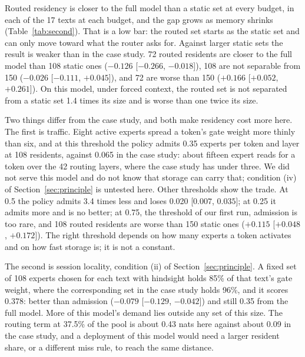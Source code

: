 \documentclass[11pt]{article}
\newcommand{\ci}[2]{[$#1$, $#2$]}
\begin{document}
Routed residency is closer to the full model than a static set at every budget, in each of the
17 texts at each budget, and the gap grows as memory shrinks (Table~\ref{tab:second}). That is
a low bar: the routed set starts as the static set and can only move toward what the router
asks for. Against larger static sets the result is weaker than in the case study. 72 routed
residents are closer to the full model than 108 static ones ($-0.126$ \ci{-0.266}{-0.018}),
108 are not separable from 150 ($-0.026$ \ci{-0.111}{+0.045}), and 72 are worse than 150
($+0.166$ \ci{+0.052}{+0.261}). On this model, under forced context, the routed set is not separated from a static set 1.4
times its size and is worse than one twice its size.

Two things differ from the case study, and both make residency cost more here. The first is
traffic. Eight active experts spread a token's gate weight more thinly than six, and at this
threshold the policy admits 0.35 experts per token and layer at 108 residents, against 0.065
in the case study: about fifteen expert reads for a token over the 42 routing layers, where
the case study has under three. We did not serve this model and do not know that storage can
carry that; condition (iv) of Section~\ref{sec:principle} is untested here. Other thresholds
show the trade. At 0.5 the policy admits 3.4 times less and loses 0.020 \ci{0.007}{0.035}; at
0.25 it admits more and is no better; at 0.75, the threshold of our first run, admission is
too rare, and 108 routed residents are worse than 150 static ones ($+0.115$
\ci{+0.048}{+0.172}). The right threshold depends on how many experts a token activates and on how fast storage is; it is not a constant.

The second is session locality, condition (ii) of Section~\ref{sec:principle}. A fixed set of
108 experts chosen for each text with hindsight holds 85\% of that text's gate weight, where
the corresponding set in the case study holds 96\%, and it scores 0.378: better than admission
($-0.079$ \ci{-0.129}{-0.042}) and still 0.35 from the full model. More of this model's demand
lies outside any set of this size. The routing term at 37.5\% of the pool is about 0.43 nats
here against about 0.09 in the case study, and a deployment of this model would need a larger
resident share, or a different miss rule, to reach the same distance.
\end{document}
